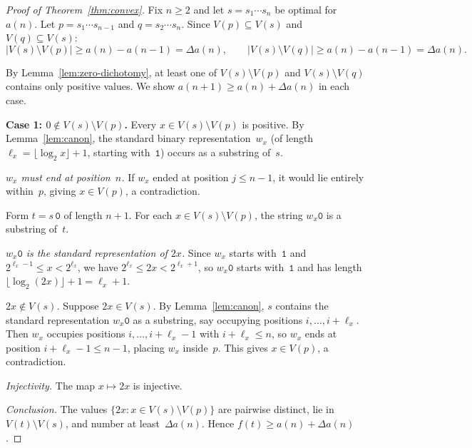 \documentclass[11pt,a4paper]{article}
\theoremstyle{plain}
\theoremstyle{definition}
\theoremstyle{remark}
\newcommand{\Da}{\Delta a}
\begin{document}
\begin{proof}[Proof of Theorem~\ref{thm:convex}]
  Fix $n \ge 2$ and let $s = s_1 \cdots s_n$ be optimal for~$a(n)$.
  Let $p = s_1 \cdots s_{n-1}$ and $q = s_2 \cdots s_n$.  Since
  $V(p) \subseteq V(s)$ and $V(q) \subseteq V(s)$:
  \begin{equation}\label{eq:Vdiff}
    |V(s) \setminus V(p)| \ge a(n) - a(n{-}1) = \Da(n), \qquad
    |V(s) \setminus V(q)| \ge a(n) - a(n{-}1) = \Da(n).
  \end{equation}

  By Lemma~\ref{lem:zero-dichotomy}, at least one of
  $V(s) \setminus V(p)$ and $V(s) \setminus V(q)$ contains only
  positive values.  We show $a(n{+}1) \ge a(n) + \Da(n)$ in each
  case.

  \medskip
  \noindent\textbf{Case 1: $0 \notin V(s) \setminus V(p)$.}
  Every $x \in V(s) \setminus V(p)$ is positive.  By
  Lemma~\ref{lem:canon}, the standard binary representation~$w_x$
  (of length $\ell_x = \lfloor \log_2 x \rfloor + 1$, starting
  with~$\mathtt{1}$) occurs as a substring of~$s$.

  \textit{$w_x$ must end at position~$n$.}
  If $w_x$ ended at position $j \le n - 1$, it would lie entirely
  within~$p$, giving $x \in V(p)$, a contradiction.

  Form $t = s\,\mathtt{0}$ of length $n + 1$.  For each
  $x \in V(s) \setminus V(p)$, the string $w_x\mathtt{0}$ is a
  substring of~$t$.

  \textit{$w_x\mathtt{0}$ is the standard representation of $2x$.}
  Since $w_x$ starts with~$\mathtt{1}$ and
  $2^{\ell_x - 1} \le x < 2^{\ell_x}$, we have
  $2^{\ell_x} \le 2x < 2^{\ell_x + 1}$, so $w_x\mathtt{0}$ starts
  with~$\mathtt{1}$ and has length
  $\lfloor \log_2(2x) \rfloor + 1 = \ell_x + 1$.

  \textit{$2x \notin V(s)$.}  Suppose $2x \in V(s)$.  By
  Lemma~\ref{lem:canon}, $s$ contains the standard representation
  $w_x\mathtt{0}$ as a substring, say occupying positions
  $i, \ldots, i + \ell_x$.  Then $w_x$ occupies positions
  $i, \ldots, i + \ell_x - 1$ with $i + \ell_x \le n$, so
  $w_x$ ends at position $i + \ell_x - 1 \le n - 1$, placing $w_x$
  inside~$p$.  This gives $x \in V(p)$, a contradiction.

  \textit{Injectivity.}  The map $x \mapsto 2x$ is injective.

  \textit{Conclusion.}  The values
  $\{2x : x \in V(s) \setminus V(p)\}$ are pairwise distinct,
  lie in $V(t) \setminus V(s)$, and number at least~$\Da(n)$.
  Hence $f(t) \ge a(n) + \Da(n)$.


\end{proof}
\end{document}
